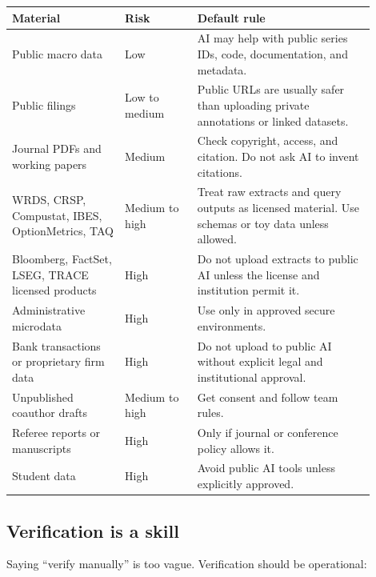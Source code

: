 \documentclass[11pt]{article}
\begin{document}
\begin{longtable}{p{0.28\linewidth}p{0.18\linewidth}p{0.44\linewidth}}
\toprule
\textbf{Material} & \textbf{Risk} & \textbf{Default rule}\\
\midrule
Public macro data & Low & AI may help with public series IDs, code, documentation, and metadata.\\
Public filings & Low to medium & Public URLs are usually safer than uploading private annotations or linked datasets.\\
Journal PDFs and working papers & Medium & Check copyright, access, and citation. Do not ask AI to invent citations.\\
WRDS, CRSP, Compustat, IBES, OptionMetrics, TAQ & Medium to high & Treat raw extracts and query outputs as licensed material. Use schemas or toy data unless allowed.\\
Bloomberg, FactSet, LSEG, TRACE licensed products & High & Do not upload extracts to public AI unless the license and institution permit it.\\
Administrative microdata & High & Use only in approved secure environments.\\
Bank transactions or proprietary firm data & High & Do not upload to public AI without explicit legal and institutional approval.\\
Unpublished coauthor drafts & Medium to high & Get consent and follow team rules.\\
Referee reports or manuscripts & High & Only if journal or conference policy allows it.\\
Student data & High & Avoid public AI tools unless explicitly approved.\\
\bottomrule
\end{longtable}

\subsection{Verification is a skill}

Saying ``verify manually'' is too vague. Verification should be operational:
\end{document}
